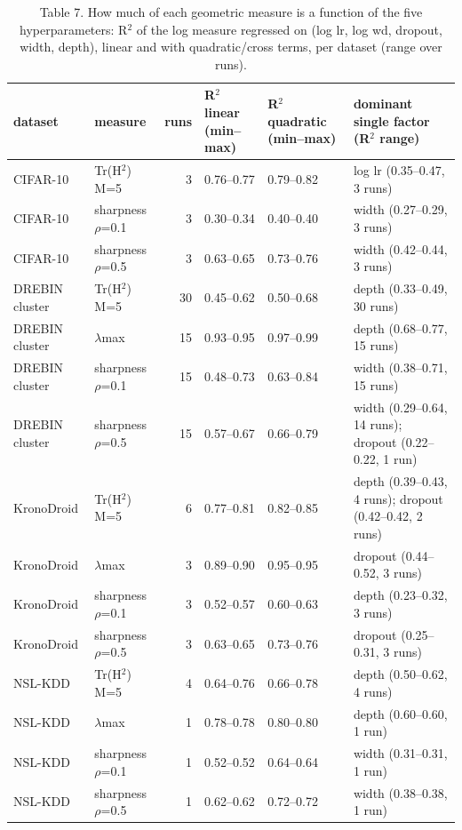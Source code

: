 \begin{table}[t]
\centering\small
\caption{Table 7. How much of each geometric measure is a function of the five hyperparameters: R$^2$ of the log measure regressed on (log lr, log wd, dropout, width, depth), linear and with quadratic/cross terms, per dataset (range over runs).}
\label{tab:r2}
\begin{tabular}{llrlll}
\toprule
dataset & measure & runs & R$^2$ linear (min–max) & R$^2$ quadratic (min–max) & dominant single factor (R$^2$ range) \\
\midrule
CIFAR-10 & Tr(H$^2$) M=5 & 3 & 0.76–0.77 & 0.79–0.82 & log lr (0.35–0.47, 3 runs) \\
CIFAR-10 & sharpness $\rho$=0.1 & 3 & 0.30–0.34 & 0.40–0.40 & width (0.27–0.29, 3 runs) \\
CIFAR-10 & sharpness $\rho$=0.5 & 3 & 0.63–0.65 & 0.73–0.76 & width (0.42–0.44, 3 runs) \\
DREBIN cluster & Tr(H$^2$) M=5 & 30 & 0.45–0.62 & 0.50–0.68 & depth (0.33–0.49, 30 runs) \\
DREBIN cluster & $\lambda$max & 15 & 0.93–0.95 & 0.97–0.99 & depth (0.68–0.77, 15 runs) \\
DREBIN cluster & sharpness $\rho$=0.1 & 15 & 0.48–0.73 & 0.63–0.84 & width (0.38–0.71, 15 runs) \\
DREBIN cluster & sharpness $\rho$=0.5 & 15 & 0.57–0.67 & 0.66–0.79 & width (0.29–0.64, 14 runs); dropout (0.22–0.22, 1 run) \\
KronoDroid & Tr(H$^2$) M=5 & 6 & 0.77–0.81 & 0.82–0.85 & depth (0.39–0.43, 4 runs); dropout (0.42–0.42, 2 runs) \\
KronoDroid & $\lambda$max & 3 & 0.89–0.90 & 0.95–0.95 & dropout (0.44–0.52, 3 runs) \\
KronoDroid & sharpness $\rho$=0.1 & 3 & 0.52–0.57 & 0.60–0.63 & depth (0.23–0.32, 3 runs) \\
KronoDroid & sharpness $\rho$=0.5 & 3 & 0.63–0.65 & 0.73–0.76 & dropout (0.25–0.31, 3 runs) \\
NSL-KDD & Tr(H$^2$) M=5 & 4 & 0.64–0.76 & 0.66–0.78 & depth (0.50–0.62, 4 runs) \\
NSL-KDD & $\lambda$max & 1 & 0.78–0.78 & 0.80–0.80 & depth (0.60–0.60, 1 run) \\
NSL-KDD & sharpness $\rho$=0.1 & 1 & 0.52–0.52 & 0.64–0.64 & width (0.31–0.31, 1 run) \\
NSL-KDD & sharpness $\rho$=0.5 & 1 & 0.62–0.62 & 0.72–0.72 & width (0.38–0.38, 1 run) \\
\bottomrule
\end{tabular}
\end{table}

